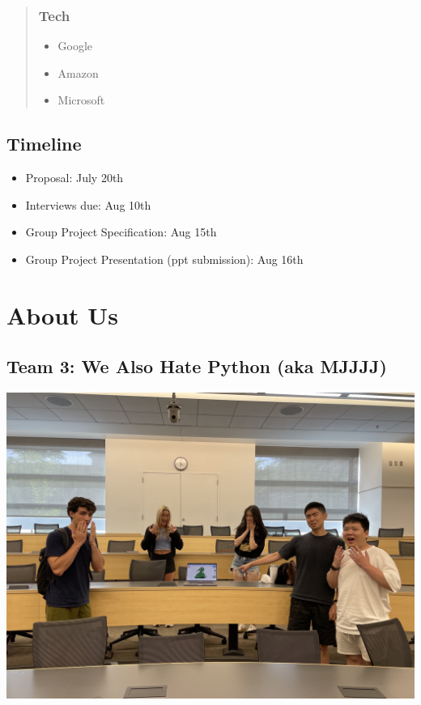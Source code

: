 \documentclass[
]{book}
\providecommand{\tightlist}{%
  \setlength{\itemsep}{0pt}\setlength{\parskip}{0pt}}
\begin{document}
\begin{quote}
\hypertarget{tech}{%
\subsection{\texorpdfstring{\textbf{Tech}}{Tech}}\label{tech}}

\begin{itemize}
\tightlist
\item
  Google
\item
  Amazon
\item
  Microsoft
\end{itemize}
\end{quote}

\hypertarget{timeline}{%
\section{\texorpdfstring{\textbf{Timeline}}{Timeline}}\label{timeline}}

\begin{itemize}
\tightlist
\item
  Proposal: July 20th
\item
  Interviews due: Aug 10th
\item
  Group Project Specification: Aug 15th
\item
  Group Project Presentation (ppt submission): Aug 16th
\end{itemize}

\hypertarget{about-us}{%
\chapter{About Us}\label{about-us}}

\hypertarget{team-3-we-also-hate-python-aka-mjjjj}{%
\section{Team 3: We Also Hate Python (aka MJJJJ)}\label{team-3-we-also-hate-python-aka-mjjjj}}

\includegraphics[width=1\linewidth]{_pictures/about_us/team_pic}
\end{document}
